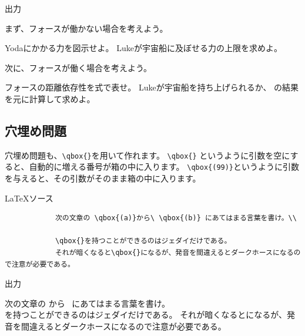 \documentclass[dvipdfmx,a4j,11pt]{jarticle}
\newenvironment{inputbox}{%
	\begin{itembox}[r]{\LaTeX ソース}
}{
	\end{itembox}
}
\newenvironment{outputbox}{%
	\begin{itembox}[r]{出力}
}{%
	\end{itembox}
}
\begin{document}
	\begin{outputbox}
			\begin{qparts}
			    \qpart まず、フォースが働かない場合を考えよう。
			        \begin{qlist}
			            \qitem Yodaにかかる力を図示せよ。
			            \qitem Lukeが宇宙船に及ぼせる力の上限を求めよ。
			        \end{qlist}
			        
			    \qpart 次に、フォースが働く場合を考えよう。
			        \begin{qlist}
			            \qitem \label{q:forcerange}
			                  フォースの距離依存性を式で表せ。
			            \qitem Lukeが宇宙船を持ち上げられるか、
			                    の結果を元に計算して求めよ。
			        \end{qlist}
			\end{qparts}

	\end{outputbox}

\subsection{穴埋め問題}
	穴埋め問題も、\verb"\qbox{}"を用いて作れます。
	\verb"\qbox{}" というように引数を空にすると、自動的に増える番号が箱の中に入ります。
	\verb"\qbox{(99)}"というように引数を与えると、その引数がそのまま箱の中に入ります。
	\begin{inputbox}
		\begin{verbatim}
			次の文章の \qbox{(a)}から\ \qbox{(b)} にあてはまる言葉を書け。\\
        		
			\qbox{}を持つことができるのはジェダイだけである。
			それが暗くなると\qbox{}になるが、発音を間違えるとダークホースになるので注意が必要である。
		\end{verbatim}
	\end{inputbox}
	
	\begin{outputbox}
		次の文章の から\  にあてはまる言葉を書け。\\
		
		\qbox{}を持つことができるのはジェダイだけである。
		それが暗くなると\qbox{}になるが、発音を間違えるとダークホースになるので注意が必要である。
	\end{outputbox}
\end{document}
